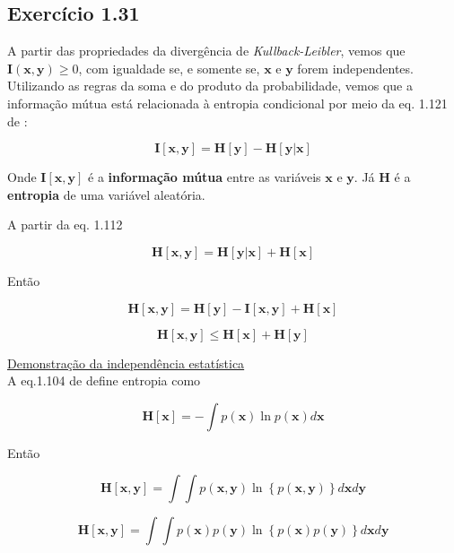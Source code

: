 \documentclass{article}
\begin{document}
\subsection{ Exerc\'icio 1.31}

  A partir das propriedades da divergência de \textit{Kullback-Leibler}, vemos que $\mathbf{I}(\mathbf{x},\mathbf{y}) \geq 0$, com igualdade se, e somente se, $\mathbf{x}$ e $\mathbf{y}$ forem independentes. Utilizando as regras da soma e do produto da probabilidade, vemos que a informação mútua está relacionada à entropia condicional por meio da eq. 1.121 de \cite{Bishop2006}:
  
  \begin{equation}
	\mathbf{I}[\mathbf{x},\mathbf{y}] = \mathbf{H}[\mathbf{y}]-\mathbf{H}[\mathbf{y}|\mathbf{x}]
  \end{equation}

 Onde $\mathbf{I}[\mathbf{x},\mathbf{y}]$ é a \textbf{informação mútua} entre as variáveis $\mathbf{x}$ e $\mathbf{y}$. Já $\mathbf{H}$ é a \textbf{entropia} de uma variável aleatória.
 
 A partir da eq. 1.112
 
 \begin{equation}
 	\mathbf{H}[\mathbf{x}, \mathbf{y}] = \mathbf{H}[\mathbf{y}|\mathbf{x}] + \mathbf{H}[\mathbf{x}]
 \end{equation}
 
 Então 
 
   \[
    \mathbf{H}[\mathbf{x}, \mathbf{y}] = \mathbf{H}[\mathbf{y}] -\mathbf{I}[\mathbf{x},\mathbf{y}]+ \mathbf{H}[\mathbf{x}]
   \]
   
   \[
   \mathbf{H}[\mathbf{x}, \mathbf{y}] \leq \mathbf{H}[\mathbf{x}] + \mathbf{H}[\mathbf{y}]  
   \]
   
  \underline{Demonstração da independência estatística} \\
  
  A eq.1.104 de \cite{Bishop2006} define entropia como
  
  \begin{equation}
  	\mathbf{H}[\mathbf{x}] = - \int p(\mathbf{x}) \ln p(\mathbf{x})d\mathbf{x}
  \end{equation}
  
  
  Então
  
  \[
    \mathbf{H}[\mathbf{x}, \mathbf{y}] = \int \int p(\mathbf{x},\mathbf{y}) \ln \left\{ p(\mathbf{x},\mathbf{y}) \right\} d\mathbf{x}d\mathbf{y}
  \]
  
  \[
  \mathbf{H}[\mathbf{x}, \mathbf{y}] = \int \int p(\mathbf{x})p(\mathbf{y}) \ln \left\{ p(\mathbf{x})p(\mathbf{y}) \right\} d\mathbf{x}d\mathbf{y}
  \]
  
\end{document}
